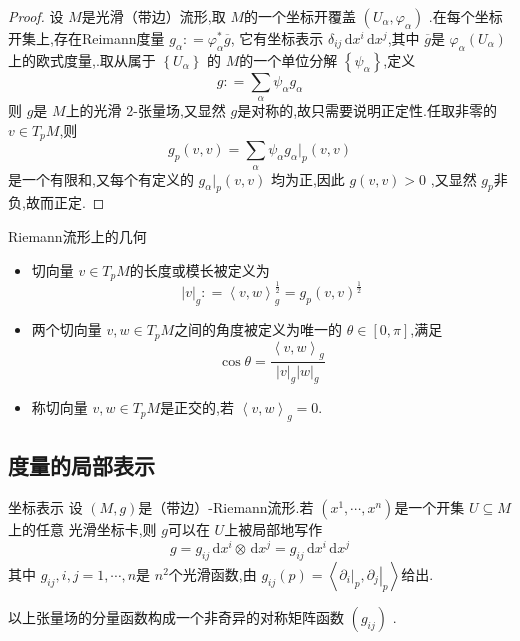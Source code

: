 \documentclass[../../几何与拓扑.tex]{subfiles}
\begin{document}
\begin{proof}
    设 $ M $是光滑（带边）流形,取 $ M $的一个坐标开覆盖 $ \left( U_{\alpha},\varphi_{\alpha} \right)  $   .在每个坐标开集上,存在Reimann度量 $g_{\alpha}: = \varphi_{\alpha} ^{*} \overline{g} $,  它有坐标表示 $
    \delta_{ij} \,\mathrm{d} x^{i}\,\mathrm{d} x^{j}
    $,其中 \(  \overline{g}  \)是  \(  \varphi _{\alpha }\left( U_{\alpha } \right)   \)上的欧式度量,.取从属于 $ \left\{ U_{\alpha} \right\} $ 的 $ M $的一个单位分解 $ \left\{ \psi_{\alpha} \right\} $,定义 $$
    g: = \sum_{\alpha} \psi_{\alpha} g_{\alpha}
    $$  则 $ g $是 $ M $上的光滑 $ 2 $-张量场,又显然 $ g $是对称的,故只需要说明正定性.任取非零的 $ v \in T_{p}M $,则 $$
    g_{p}\left( v,v \right) = \sum_{\alpha} \psi_{\alpha}g_{\alpha}|_{p}\left( v,v \right)  
    $$    是一个有限和,又每个有定义的 $ g_{\alpha}|_{p}\left( v,v \right)  $  均为正,因此 $ g\left( v,v \right)>0  $ ,又显然 $ g_{p} $非负,故而正定. 
\end{proof}

\begin{definition}{Riemann流形上的几何}
    \begin{itemize} 
      \item 切向量 $ v \in T_{p}M $的长度或模长被定义为 $$
      \left| v \right|_{g}: = \left<v,w \right>_{g}^{\frac{1}{2}} = g_{p}\left( v,v \right)^{\frac{1}{2}} 
      $$
      \item 两个切向量 $ v,w \in T_{p}M $之间的角度被定义为唯一的 $ \theta \in [0,\pi] $,满足 $$
      \cos \theta = \frac{\left<v,w \right>_{g} }{\left| v \right|_{g}\left| w \right|_{g}   } 
      $$
      \item 称切向量 $ v,w \in T_{p}M $是正交的,若 $ \left<v,w \right>_{g} = 0 $.       
    \end{itemize}   
\end{definition}


\subsection{度量的局部表示}

\begin{proposition}{坐标表示}
    设 \(  \left( M,g \right)   \)是（带边）-Riemann流形.若 \(  \left(  x^1,\cdots,x^n  \right)   \)是一个开集 \(  U\subseteq M  \)上的任意
    光滑坐标卡,则 \(  g  \)可以在 \(  U  \)上被局部地写作 \[
    g =  g_{ij} \,\mathrm{d} x^{i}\otimes \,\mathrm{d} x^{j} =  g_{ij} \,\mathrm{d} x^{i}\,\mathrm{d} x^{j}  
    \]     其中 \(  g_{ij},i,j=  1,\cdots,n   \)是 \(  n^{2}  \)个光滑函数,由 \(  g_{ij}\left( p \right)= \left< \left. \partial _{i} \right|_{p}, \left. \partial _{j} \right|_{p} \right> \)给出.
    
    以上张量场的分量函数构成一个非奇异的对称矩阵函数 \(  \left( g_{ij} \right)   \) .
\end{proposition}
\end{document}

